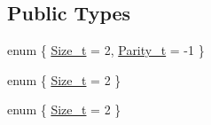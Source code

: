 \subsection*{Public Types}
\begin{DoxyCompactItemize}
\item 
enum \{ \mbox{\hyperlink{structHadron_1_1G2uRep_a995e1c4b234da5e51de711722a6343afacfcbaaee9e10a4f3453542af7bd77599}{Size\+\_\+t}} = 2, 
\mbox{\hyperlink{structHadron_1_1G2uRep_a0d2f7e697761abc08bd521f1c1c35cdfa49e834cee02dc791fe51e4f6e4defae8}{Parity\+\_\+t}} = -\/1
 \}
\item 
enum \{ \mbox{\hyperlink{structHadron_1_1G2uRep_a995e1c4b234da5e51de711722a6343afacfcbaaee9e10a4f3453542af7bd77599}{Size\+\_\+t}} = 2
 \}
\item 
enum \{ \mbox{\hyperlink{structHadron_1_1G2uRep_a995e1c4b234da5e51de711722a6343afacfcbaaee9e10a4f3453542af7bd77599}{Size\+\_\+t}} = 2
 \}
\end{DoxyCompactItemize}
